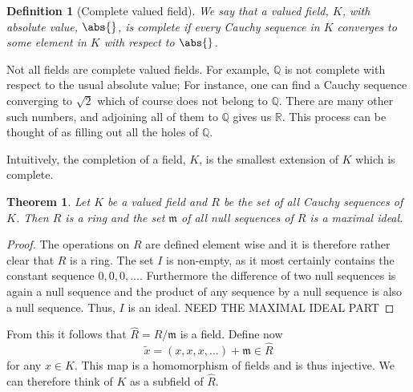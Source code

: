 \documentclass{article}
\newtheorem{theorem}{Theorem}[section]
\newtheorem{definition}{Definition}[section]
\newcommand{\mfrak}[1]{\mathfrak{#1}}
\newcommand{\mbb}[1]{\mathbb{#1}}
\begin{document}
\begin{definition}[Complete valued field]
    We say that a valued field, $K$, with absolute value, $\abs{}$, is complete if every Cauchy sequence in $K$ converges to some element in $K$ with respect to $\abs{}$.
\end{definition}


Not all fields are complete valued fields. For example, $\mbb Q$ is not complete with respect to the usual absolute value; For instance, one can find a Cauchy sequence converging to $\sqrt 2$ which of course does not belong to $\mbb Q$. There are many other such numbers, and adjoining all of them to $\mbb Q$ gives us $\mbb R$. This process can be thought of as filling out all the holes of $\mbb Q$.

Intuitively, the completion of a field, $K$, is the smallest extension of $K$ which is complete.

\begin{theorem}
    Let $K$ be a valued field and $R$ be the set of all Cauchy sequences of $K$. Then $R$ is a ring and the set $\mfrak m$ of all null sequences of $R$ is a maximal ideal.
\end{theorem}
\begin{proof}
    The operations on $R$ are defined element wise and it is therefore rather clear that $R$ is a ring. The set $I$ is non-empty, as it most certainly contains the constant sequence $0,0,0,...$. Furthermore the difference of two null sequences is again a null sequence and the product of any sequence by a null sequence is also a null sequence. Thus, $I$ is an ideal. NEED THE MAXIMAL IDEAL PART
\end{proof}

From this it follows that $\hat R = R / \mfrak m$ is a field. Define now $$\tilde x = (x,x,x,...) + \mfrak m \in \hat R$$ for any $x \in K$. This map is a homomorphism of fields and is thus injective. We can therefore think of $K$ as a subfield of $\hat R$.
\end{document}
